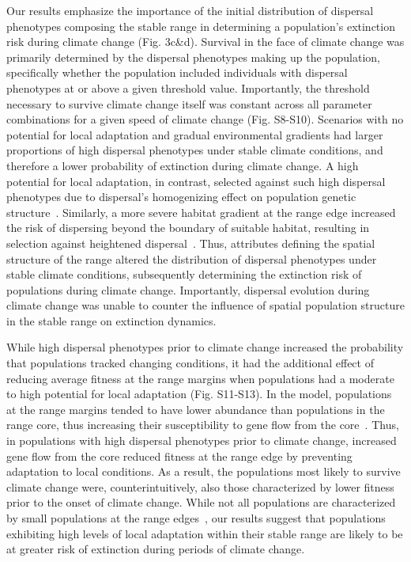 \documentclass[12pt, oneside]{article}
\begin{document}
Our results emphasize the importance of the initial distribution of dispersal phenotypes composing the stable range in determining a population's extinction risk during climate change (Fig. 3c\&d). Survival in the face of climate change was primarily determined by the dispersal phenotypes making up the population, specifically whether the population included individuals with dispersal phenotypes at or above a given threshold value. Importantly, the threshold necessary to survive climate change itself was constant across all parameter combinations for a given speed of climate change (Fig. S8-S10). Scenarios with no potential for local adaptation and gradual environmental gradients had larger proportions of high dispersal phenotypes under stable climate conditions, and therefore a lower probability of extinction during climate change. A high potential for local adaptation, in contrast, selected against such high dispersal phenotypes due to dispersal's homogenizing effect on population genetic structure~\citep{lenormand2002gene}. Similarly, a more severe habitat gradient at the range edge increased the risk of dispersing beyond the boundary of suitable habitat, resulting in selection against heightened dispersal~\citep{shaw2014population}. Thus, attributes defining the spatial structure of the range altered the distribution of dispersal phenotypes under stable climate conditions, subsequently determining the extinction risk of populations during climate change. Importantly, dispersal evolution during climate change was unable to counter the influence of spatial population structure in the stable range on extinction dynamics.

While high dispersal phenotypes prior to climate change increased the probability that populations tracked changing conditions, it had the additional effect of reducing average fitness at the range margins when populations had a moderate to high potential for local adaptation (Fig. S11-S13). In the model, populations at the range margins tended to have lower abundance than populations in the range core, thus increasing their susceptibility to gene flow from the core~\citep{lenormand2002gene}. Thus, in populations with high dispersal phenotypes prior to climate change, increased gene flow from the core reduced fitness at the range edge by preventing adaptation to local conditions. As a result, the populations most likely to survive climate change were, counterintuitively, also those characterized by lower fitness prior to the onset of climate change. While not all populations are characterized by small populations at the range edges~\citep{dallas2017species}, our results suggest that populations exhibiting high levels of local adaptation within their stable range are likely to be at greater risk of extinction during periods of climate change.
\end{document}
